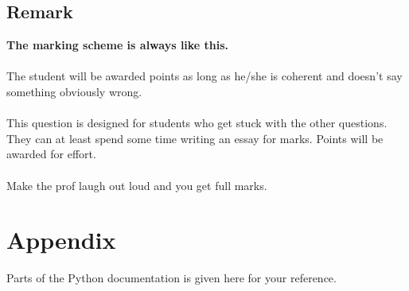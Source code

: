 \subsection{Remark}
\textbf{The marking scheme is always like this.} \\ \\
The student will be awarded points as long as he/she is coherent and doesn’t say something
obviously wrong. \\ \\
This question is designed for students who get stuck with the other questions. They can at
least spend some time writing an essay for marks. Points will be awarded for effort. \\ \\
Make the prof laugh out loud and you get full marks.
\begin{flushright}
    [3 marks]
\end{flushright}

\newpage
\section{Appendix}
Parts of the Python documentation is given here for your reference.
